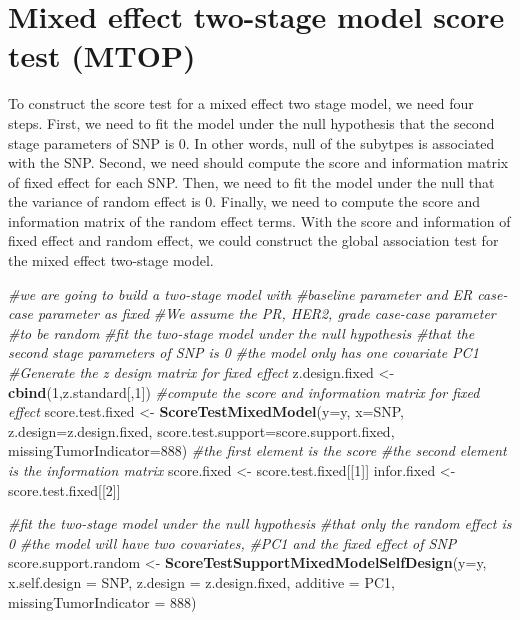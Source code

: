 \documentclass[11pt,]{article}
\newenvironment{Shaded}{\begin{snugshade}}{\end{snugshade}}
\newcommand{\KeywordTok}[1]{\textcolor[rgb]{0.13,0.29,0.53}{\textbf{#1}}}
\newcommand{\DataTypeTok}[1]{\textcolor[rgb]{0.13,0.29,0.53}{#1}}
\newcommand{\DecValTok}[1]{\textcolor[rgb]{0.00,0.00,0.81}{#1}}
\newcommand{\StringTok}[1]{\textcolor[rgb]{0.31,0.60,0.02}{#1}}
\newcommand{\CommentTok}[1]{\textcolor[rgb]{0.56,0.35,0.01}{\textit{#1}}}
\newcommand{\NormalTok}[1]{#1}
\begin{document}
\section{Mixed effect two-stage model score test
(MTOP)}\label{mixed-effect-two-stage-model-score-test-mtop}

To construct the score test for a mixed effect two stage model, we need
four steps. First, we need to fit the model under the null hypothesis
that the second stage parameters of SNP is 0. In other words, null of
the subytpes is associated with the SNP. Second, we need should compute
the score and information matrix of fixed effect for each SNP. Then, we
need to fit the model under the null that the variance of random effect
is 0. Finally, we need to compute the score and information matrix of
the random effect terms. With the score and information of fixed effect
and random effect, we could construct the global association test for
the mixed effect two-stage model.

\begin{Shaded}
\begin{Highlighting}[]
\CommentTok{#we are going to build a two-stage model with }
\CommentTok{#baseline parameter and ER case-case parameter as fixed}
\CommentTok{#We assume the PR, HER2, grade case-case parameter }
\CommentTok{#to be random}
\CommentTok{#fit the two-stage model under the null hypothesis}
\CommentTok{#that the second stage parameters of SNP is 0}
\CommentTok{#the model only has one covariate PC1}
\CommentTok{#Generate the z design matrix for fixed effect}
\NormalTok{z.design.fixed <-}\StringTok{ }\KeywordTok{cbind}\NormalTok{(}\DecValTok{1}\NormalTok{,z.standard[,}\DecValTok{1}\NormalTok{])}
\CommentTok{#compute the score and information matrix for fixed effect}
\NormalTok{score.test.fixed <-}\StringTok{ }\KeywordTok{ScoreTestMixedModel}\NormalTok{(}\DataTypeTok{y=}\NormalTok{y,}
                    \DataTypeTok{x=}\NormalTok{SNP,}
                    \DataTypeTok{z.design=}\NormalTok{z.design.fixed,}
                    \DataTypeTok{score.test.support=}\NormalTok{score.support.fixed,}
                    \DataTypeTok{missingTumorIndicator=}\DecValTok{888}\NormalTok{)}
\CommentTok{#the first element is the score}
\CommentTok{#the second element is the information matrix}
\NormalTok{score.fixed <-}\StringTok{ }\NormalTok{score.test.fixed[[}\DecValTok{1}\NormalTok{]]}
\NormalTok{infor.fixed <-}\StringTok{ }\NormalTok{score.test.fixed[[}\DecValTok{2}\NormalTok{]]}

\CommentTok{#fit the two-stage model under the null hypothesis}
\CommentTok{#that only the random effect is 0}
\CommentTok{#the model will have two covariates, }
\CommentTok{#PC1 and the fixed effect of SNP}
\NormalTok{score.support.random <-}\StringTok{ }\KeywordTok{ScoreTestSupportMixedModelSelfDesign}\NormalTok{(}\DataTypeTok{y=}\NormalTok{y,}
                        \DataTypeTok{x.self.design  =}\NormalTok{ SNP,}
                        \DataTypeTok{z.design =}\NormalTok{ z.design.fixed,}
                        \DataTypeTok{additive =}\NormalTok{ PC1,}
                        \DataTypeTok{missingTumorIndicator =} \DecValTok{888}\NormalTok{)}
\end{Highlighting}
\end{Shaded}
\end{document}
